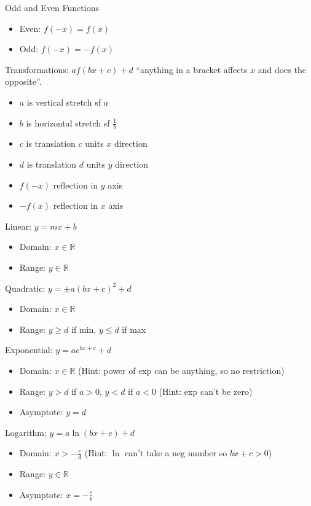 \documentclass[10pt,a4paper,oneside]{book}
\begin{document}
Odd and Even Functions
\begin{itemize}
    \item Even: $f(-x)=f(x)$
    \item Odd: $f(-x)=-f(x)$
\end{itemize}

Transformations: $af(bx+c)+d$ ``anything in a bracket affects $x$ and does the opposite''.
\begin{itemize}
    \item $a$ is vertical stretch sf $a$
    \item $b$ is horizontal stretch sf $\frac{1}{b}$
    \item $c$ is translation $c$ units $x$ direction 
    \item $d$ is translation $d$ units $y$ direction 
    \item $f(-x)$ reflection in $y$ axis 
    \item $-f(x)$ reflection in $x$ axis 
\end{itemize}

Linear: $y=mx+b$
\begin{itemize}
    \item Domain: $x\in \mathbb{R}$
    \item Range: $y\in \mathbb{R}$
\end{itemize}

Quadratic: $y=\pm a(bx+c)^2+d$
\begin{itemize}
    \item Domain: $x\in \mathbb{R}$
    \item Range: $y\geq d$ if min, $y\leq d$ if max 
\end{itemize}

Exponential: $y=ae^{bx+c}+d$
\begin{itemize}
    \item Domain: $x\in \mathbb{R}$ (Hint: power of exp can be anything, so no restriction)
    \item Range: $y>d$ if $a>0$, $y<d$ if $a<0$ (Hint: exp can't be zero)
    \item Asymptote: $y=d$
\end{itemize}

Logarithm: $y=a\ln (bx+c)+d$
\begin{itemize}
    \item Domain: $x>-\frac{c}{d}$ (Hint: $\ln$ can't take a neg number so $bx+c>0$)
    \item Range: $y\in \mathbb{R}$
    \item Asymptote: $x=-\frac{c}{b}$
\end{itemize}
\end{document}

